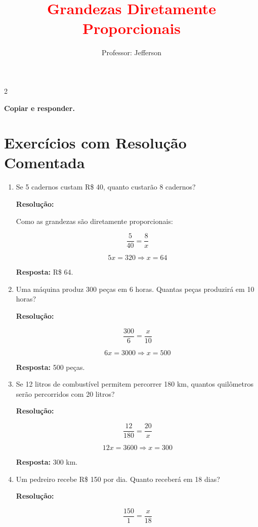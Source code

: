 \documentclass[11pt]{article}
\title{\textcolor{red}{Grandezas Diretamente Proporcionais}}
\author{Professor: Jefferson}
\date{}
\begin{document}
\maketitle
\vspace{-1cm}

\begin{multicols}{2}
    \begin{center} 
        \textbf{Copiar e responder.}
    \end{center}

\section*{Exercícios com Resolução Comentada}

\begin{enumerate}[leftmargin=*]

\item Se 5 cadernos custam R\$ 40, quanto custarão 8 cadernos?

\textbf{Resolução:}

Como as grandezas são diretamente proporcionais:

\[
\frac{5}{40} = \frac{8}{x}
\]

\[
5x = 320
\Rightarrow x = 64
\]

\textbf{Resposta:} R\$ 64.

\item Uma máquina produz 300 peças em 6 horas. Quantas peças produzirá em 10 horas?

\textbf{Resolução:}

\[
\frac{300}{6} = \frac{x}{10}
\]

\[
6x = 3000
\Rightarrow x = 500
\]

\textbf{Resposta:} 500 peças.

\item Se 12 litros de combustível permitem percorrer 180 km, quantos quilômetros serão percorridos com 20 litros?

\textbf{Resolução:}

\[
\frac{12}{180} = \frac{20}{x}
\]

\[
12x = 3600
\Rightarrow x = 300
\]

\textbf{Resposta:} 300 km.

\item Um pedreiro recebe R\$ 150 por dia. Quanto receberá em 18 dias?

\textbf{Resolução:}

\[
\frac{150}{1} = \frac{x}{18}
\]


\end{enumerate}
\end{multicols}
\end{document}
